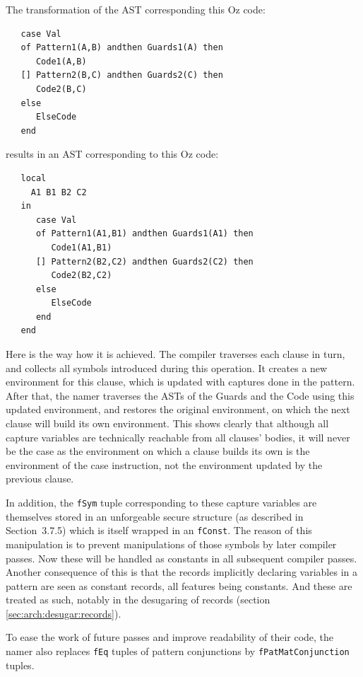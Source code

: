 \documentclass[a4paper]{memoir}
\begin{document}
The transformation of the AST corresponding this Oz code:
\begin{lstlisting}
   case Val
   of Pattern1(A,B) andthen Guards1(A) then
      Code1(A,B)
   [] Pattern2(B,C) andthen Guards2(C) then
      Code2(B,C)
   else
      ElseCode
   end
\end{lstlisting}
results in an AST corresponding to this Oz code:
\begin{lstlisting}
   local
     A1 B1 B2 C2
   in
      case Val
      of Pattern1(A1,B1) andthen Guards1(A1) then
         Code1(A1,B1)
      [] Pattern2(B2,C2) andthen Guards2(C2) then
         Code2(B2,C2)
      else
         ElseCode
      end
   end
\end{lstlisting}

Here is the way how it is achieved. The compiler traverses each clause in turn,
and collects all symbols introduced during this operation. It creates a new
environment for this clause, which is updated with captures done in the
pattern. After that, the namer traverses the ASTs of the Guards and the Code
using this updated environment, and restores the original environment, on which
the next clause will build its own environment. This shows clearly that
although all capture variables are technically reachable from all clauses'
bodies, it will never be the case as the environment on which a clause builds
its own is the environment of the case instruction, not the environment updated
by the previous clause. 

In addition, the \lstinline!fSym! tuple corresponding to these capture
variables are themselves stored in an unforgeable secure structure (as
described in \cite{CTMCP} Section~3.7.5) which is itself wrapped in an
\lstinline!fConst!. The reason of this manipulation is to prevent manipulations
of those symbols by later compiler passes. Now these will be handled as
constants in all subsequent compiler passes. Another consequence of this is
that the records implicitly declaring variables in a pattern are seen as
constant records, all features being constants. And these are treated as such,
notably in the desugaring of records (section \ref{sec:arch:desugar:records}).

To ease the work of future passes and improve readability of their code, the
namer also replaces \lstinline!fEq! tuples of pattern conjunctions by
\lstinline!fPatMatConjunction! tuples.
\end{document}
